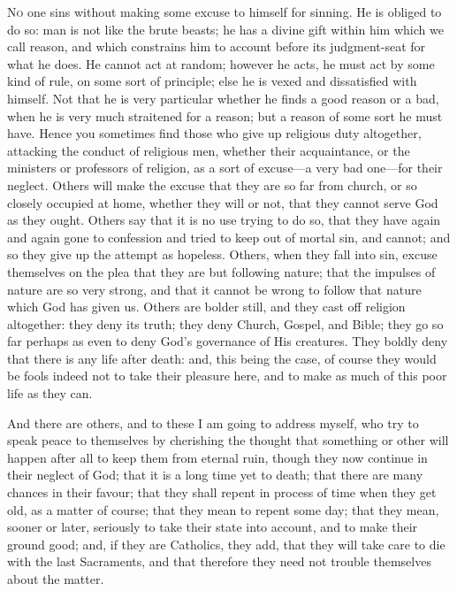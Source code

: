 N\textsc{o} one sins without making some excuse to himself for sinning. He
is obliged to do so: man is not like the brute beasts; he has a divine
gift within him which we call reason, and which constrains him to
account before its judgment-seat for what he does. He cannot act at
random; however he acts, he must act by some kind of rule, on some
sort of principle; else he is vexed and dissatisfied with himself. Not
that he is very particular whether he finds a good reason or a bad,
when he is very much straitened for a reason; but a reason of some
sort he must have. Hence you sometimes find those who give up
religious duty altogether, attacking the conduct of religious men,
whether their acquaintance, or the ministers or professors of
religion, as a sort of excuse—a very bad one—for their neglect.
Others will make the excuse that they are so far from church, or so
closely occupied at home, whether they will or not, that they cannot
serve God as they ought. Others say that it is no use trying to do so,
that they have again and again gone to confession and tried to keep
out of mortal sin, and cannot; and so they give up the attempt as
hopeless. Others, when they fall into sin, excuse themselves on the
plea that they are but following nature; that the impulses of nature
are so very strong, and that it cannot be wrong to follow that nature
which God has given us. Others are bolder still, and they cast off
religion altogether: they deny its truth; they deny Church, Gospel,
and Bible; they go so far perhaps as even to deny God's governance of
His creatures. They boldly deny that there is any life after death:
and, this being the case, of course they would be fools indeed not to
take their pleasure here, and to make as much of this poor life as
they can.

And there are others, and to these I am going to address myself,
who try to speak peace to themselves by cherishing the thought that
something or other will happen after all to keep them from eternal
ruin, though they now continue in their neglect of God; that it is a
long time yet to death; that there are many chances in their favour;
that they shall repent in process of time when they get old, as a
matter of course; that they mean to repent some day; that they mean,
sooner or later, seriously to take their state into account, and to
make their ground good; and, if they are Catholics, they add, that
they will take care to die with the last Sacraments, and that
therefore they need not trouble themselves about the matter.

